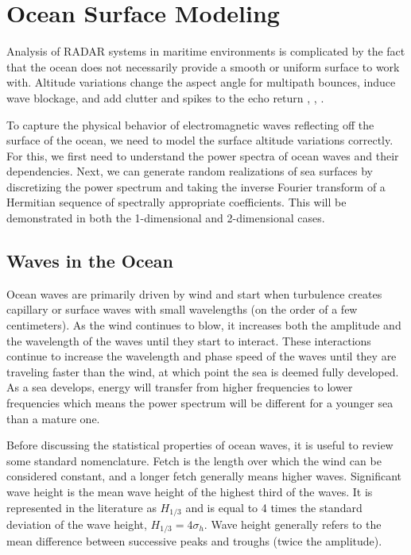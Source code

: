 \chapter{Ocean Surface Modeling}
Analysis of RADAR systems in maritime environments is complicated by the fact that the ocean does not necessarily provide a smooth or uniform surface to work with. Altitude variations change the aspect angle for multipath bounces, induce wave blockage, and add clutter and spikes to the echo return \cite{skolnik_handbook}, \cite{blake_radar}, \cite{nathanson_radar}.

To capture the physical behavior of electromagnetic waves reflecting off the surface of the ocean, we need to model the surface altitude variations correctly. For this, we first need to understand the power spectra of ocean waves and their dependencies. Next, we can generate random realizations of sea surfaces by discretizing the power spectrum and taking the inverse Fourier transform of a Hermitian sequence of spectrally appropriate coefficients. This will be demonstrated in both the 1-dimensional and 2-dimensional cases.

\section {Waves in the Ocean}
Ocean waves are primarily driven by wind and start when turbulence creates capillary or surface waves with small wavelengths (on the order of a few centimeters). As the wind continues to blow, it increases both the amplitude and the wavelength of the waves until they start to interact. These interactions continue to increase the wavelength and phase speed of the waves until they are traveling faster than the wind, at which point the sea is deemed fully developed. As a sea develops, energy will transfer from higher frequencies to lower frequencies which means the power spectrum will be different for a younger sea than a mature one.

Before discussing the statistical properties of ocean waves, it is useful to review some standard nomenclature. Fetch is the length over which the wind can be considered constant, and a longer fetch generally means higher waves. Significant wave height is the mean wave height of the highest third of the waves. It is represented in the literature as $H_{1/3}$ and is equal to 4 times the standard deviation of the wave height, $H_{1/3} = 4\sigma_h$. Wave height generally refers to the mean difference between successive peaks and troughs (twice the amplitude).

